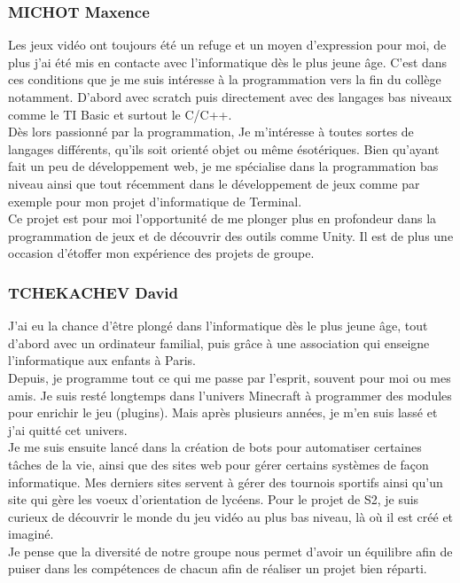 \documentclass{article}
\begin{document}
\subsubsection{MICHOT Maxence}

Les jeux vidéo ont toujours été un refuge et un moyen d'expression pour moi, de plus j'ai été mis en contacte avec l'informatique dès le plus jeune âge. C'est dans ces conditions que je me suis intéresse à la programmation vers la fin du collège notamment. D'abord avec scratch puis directement avec des langages bas niveaux comme le TI Basic et surtout le C/C++. \\
Dès lors passionné par la programmation, Je m'intéresse à toutes sortes de langages différents, qu'ils soit orienté objet ou même ésotériques. Bien qu'ayant fait un peu de développement web, je me spécialise dans la programmation bas niveau ainsi que tout récemment dans le développement de jeux comme par exemple pour mon projet d'informatique de Terminal. \\
Ce projet est pour moi l'opportunité de me plonger plus en profondeur dans la programmation de jeux et de découvrir des outils comme Unity. Il est de plus une occasion d'étoffer mon expérience des projets de groupe.

\subsubsection{TCHEKACHEV David}

J'ai eu la chance d'être plongé dans l'informatique dès le plus jeune âge, tout d'abord avec un ordinateur familial, puis grâce à une association qui enseigne l'informatique aux enfants à Paris. \\
Depuis, je programme tout ce qui me passe par l'esprit, souvent pour moi ou mes amis. Je suis resté longtemps dans l'univers Minecraft à programmer des modules pour enrichir le jeu (plugins). Mais après plusieurs années, je m'en suis lassé et j'ai quitté cet univers. \\
Je me suis ensuite lancé dans la création de bots pour automatiser certaines tâches de la vie, ainsi que des sites web pour gérer certains systèmes de façon informatique. Mes derniers sites servent à gérer des tournois sportifs ainsi qu'un site qui gère les voeux d'orientation de lycéens.
Pour le projet de S2, je suis curieux de découvrir le monde du jeu vidéo au plus bas niveau, là où il est créé et imaginé.  \\
Je pense que la diversité de notre groupe nous permet d'avoir un équilibre afin de puiser dans les compétences de chacun afin de réaliser un projet bien réparti.
\end{document}
